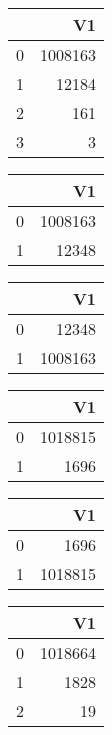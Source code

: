 \bigskip\bigskip
\centering
\begin{tabular}{rr}
  \hline
 & V1 \\ 
  \hline
0 & 1008163 \\ 
  1 & 12184 \\ 
  2 & 161 \\ 
  3 &   3 \\ 
   \hline
\end{tabular}

\bigskip\bigskip
\centering
\begin{tabular}{rr}
  \hline
 & V1 \\ 
  \hline
0 & 1008163 \\ 
  1 & 12348 \\ 
   \hline
\end{tabular}

\bigskip\bigskip
\centering
\begin{tabular}{rr}
  \hline
 & V1 \\ 
  \hline
0 & 12348 \\ 
  1 & 1008163 \\ 
   \hline
\end{tabular}

\bigskip\bigskip
\centering
\begin{tabular}{rr}
  \hline
 & V1 \\ 
  \hline
0 & 1018815 \\ 
  1 & 1696 \\ 
   \hline
\end{tabular}

\bigskip\bigskip
\centering
\begin{tabular}{rr}
  \hline
 & V1 \\ 
  \hline
0 & 1696 \\ 
  1 & 1018815 \\ 
   \hline
\end{tabular}

\bigskip\bigskip
\centering
\begin{tabular}{rr}
  \hline
 & V1 \\ 
  \hline
0 & 1018664 \\ 
  1 & 1828 \\ 
  2 &  19 \\ 
   \hline
\end{tabular}

